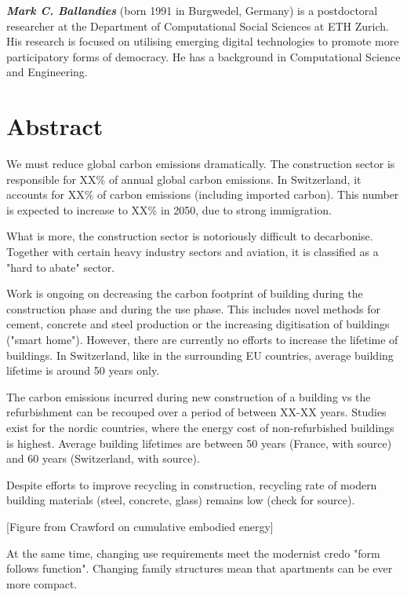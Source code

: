 \documentclass{article}
\begin{document}
\textbf{\textit{Mark C. Ballandies}} (born 1991 in Burgwedel, Germany) is a postdoctoral researcher at the Department of Computational Social Sciences at ETH Zurich. His research is focused on utilising emerging digital technologies to promote more participatory forms of democracy. He has a background in Computational Science and Engineering.


\clearpage
\tableofcontents

\section{\centering Abstract}

\begin{minipage}{0.55\textwidth}

    We must reduce global carbon emissions dramatically. The construction sector is responsible for XX\% of annual global carbon emissions. In Switzerland, it accounts for XX\% of carbon emissions (including imported carbon). This number is expected to increase to XX\% in 2050, due to strong immigration.
    
    What is more, the construction sector is notoriously difficult to decarbonise. Together with certain heavy industry sectors and aviation, it is classified as a "hard to abate" sector.
    
    Work is ongoing on decreasing the carbon footprint of building during the construction phase and during the use phase. This includes novel methods for cement, concrete and steel production or the increasing digitisation of buildings ("smart home"). However, there are currently no efforts to increase the lifetime of buildings. In Switzerland, like in the surrounding EU countries, average building lifetime is around 50 years only.
    
    The carbon emissions incurred during new construction of a building vs the refurbishment can be recouped over a period of between XX-XX years. Studies exist for the nordic countries, where the energy cost of non-refurbished buildings is highest. Average building lifetimes are between 50 years (France, with source) and 60 years (Switzerland, with source).
    
    Despite efforts to improve recycling in construction, recycling rate of modern building materials (steel, concrete, glass) remains low (check for source).
    
    [Figure from Crawford on cumulative embodied energy]
    
    At the same time, changing use requirements meet the modernist credo "form follows function". Changing family structures mean that apartments can be ever more compact.
    

\end{minipage}
\end{document}
